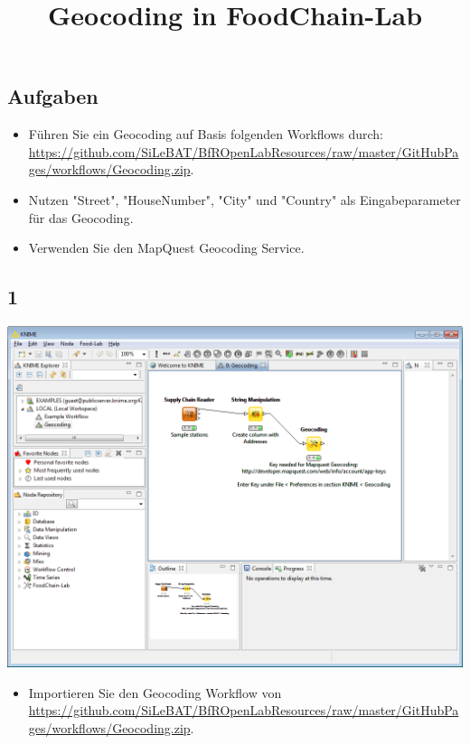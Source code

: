 \documentclass{beamer}
\title{Geocoding in FoodChain-Lab}
\date{}
\begin{document}
\maketitle

\section{ }

\subsection{Aufgaben}
\begin{frame}
	\begin{itemize}
		\item Führen Sie ein Geocoding auf Basis folgenden Workflows durch: \url{https://github.com/SiLeBAT/BfROpenLabResources/raw/master/GitHubPages/workflows/Geocoding.zip}.
		\item Nutzen "Street", "HouseNumber", "City" und "Country" als Eingabeparameter für das Geocoding.
		\item Verwenden Sie den MapQuest Geocoding Service.
	\end{itemize}
\end{frame}
 
\subsection{1}
\begin{frame}
	\begin{center}
  		\includegraphics[height=0.6\textheight]{1.png}
	\end{center}
	\begin{itemize}
		\item Importieren Sie den Geocoding Workflow von \url{https://github.com/SiLeBAT/BfROpenLabResources/raw/master/GitHubPages/workflows/Geocoding.zip}.
	\end{itemize}
\end{frame}
\end{document}
